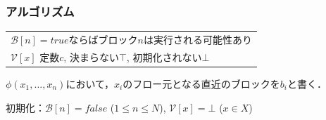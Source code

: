 \documentclass[dvipdfmx]{beamer}
\begin{document}
\begin{frame}
  \frametitle{アルゴリズム}
  {\scriptsize
  \begin{tabular}{l}
  $\mathcal{B}[n]=true$ならばブロック$n$は実行される可能性あり\\
  $\mathcal{V}[x]$ 定数$c$, 決まらない$\top$, 初期化されない$\bot$
  \end{tabular}}

  \vspace*{5pt}

  {\scriptsize\color[rgb]{0,0.5,0}
  $\phi(x_1,\ldots,x_n)$において，$x_i$のフロー元となる直近のブロックを$b_i$と書く．
  }

  \vspace*{5pt}

  {\scriptsize
  初期化：$\mathcal{B}[n]=false$ ($1\leq n\leq N$), 
  $\mathcal{V}[x]=\bot$ ($x\in X$)
  }

  \vspace*{5pt}


\end{frame}
\end{document}

